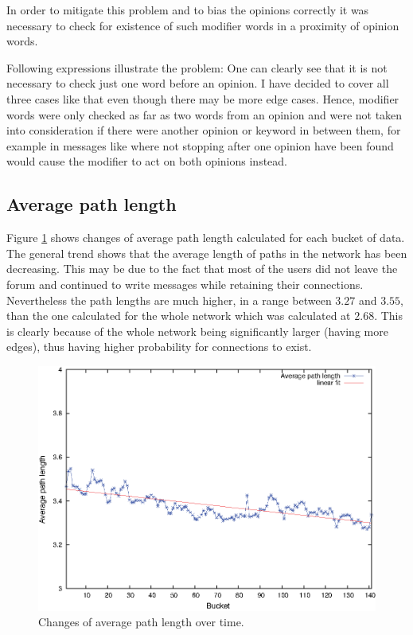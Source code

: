       In order to mitigate this problem and to bias the opinions correctly it was necessary to check for existence of such modifier words in a proximity of opinion words.
      
      Following expressions illustrate the problem:   
      One can clearly see that it is not necessary to check just one word before an opinion. I have decided to cover all three cases like that even though there may be more edge cases. Hence, modifier words were only checked as far as two words from an opinion and were not taken into consideration if there were another opinion or keyword in between them, for example in messages like  where not stopping after one opinion have been found would cause the modifier to act on both opinions instead.

  \subsection{Average path length}

    Figure \ref{fig:avg_path} shows changes of average path length calculated for each bucket of data. The general trend shows that the average length of paths in the network has been decreasing. This may be due to the fact that most of the users did not leave the forum and continued to write messages while retaining their connections. Nevertheless the path lengths are much higher, in a range between $3.27$ and $3.55$, than the one calculated for the whole network which was calculated at $2.68$. This is clearly because of the whole network being significantly larger (having more edges), thus having higher probability for connections to exist.
    \begin{figure}[H]
      \centering
      \includegraphics[width=\textwidth]{chapters/03_implementation/avg_path}
      \caption{Changes of average path length over time.}
      \label{fig:avg_path}
    \end{figure}

